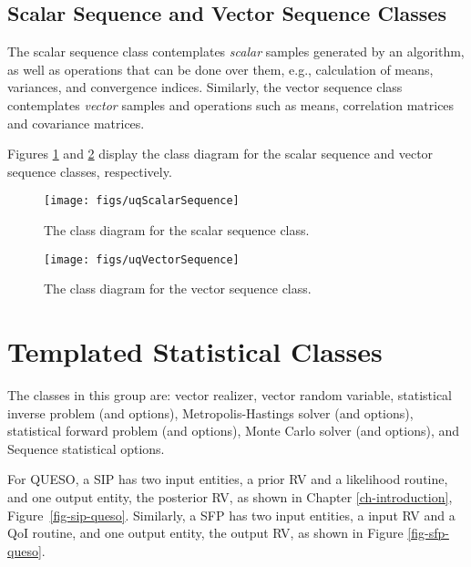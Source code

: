 
\subsection{Scalar Sequence and Vector Sequence Classes}\label{sec:scalar-vector-sequence}
%
The scalar sequence class contemplates {\it scalar} samples generated by an algorithm, as well as operations that can
be done over them, e.g., calculation of means, variances, and convergence indices.
Similarly, the vector sequence class contemplates {\it vector} samples and operations such as means, correlation matrices and covariance matrices.

Figures \ref{fig-scalar-sequence-class} and \ref{fig-vector-sequence-class} display the class diagram for the scalar sequence  and vector sequence classes, respectively.

\begin{figure}[htpb]
\centering
\texttt{[image: figs/uqScalarSequence]}
\vspace{-8pt}
\caption{The class diagram for the scalar sequence class.}
\label{fig-scalar-sequence-class}
\end{figure}

\begin{figure}[htpb]
\centering
\texttt{[image: figs/uqVectorSequence]}
\vspace{-8pt}
\caption{The class diagram for the vector sequence class.}
\label{fig-vector-sequence-class}
\end{figure}



\section{Templated Statistical Classes}

The classes in this group are: vector realizer, vector random variable, statistical inverse problem (and options), Metropolis-Hastings solver (and options), statistical forward problem (and options), Monte Carlo solver (and options), and Sequence statistical options.

For QUESO, a SIP has two input entities, a prior RV and
a likelihood routine, and one output entity, the posterior RV, as shown in Chapter \ref{ch-introduction}, Figure~\ref{fig-sip-queso}.
%
Similarly, a SFP has two input entities, a input RV and
a QoI routine, and one output entity, the output RV, as shown in Figure \ref{fig-sfp-queso}.


